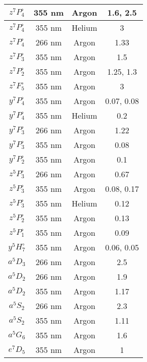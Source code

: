 \documentclass[12pt,twoside]{reedthesis}
\begin{document}
\begin{longtable}{||c|c|c|c||}
	    $z^{7}P^{\circ}_{4}$ & 355 nm & Argon & 1.6, 2.5 \\\hline
	    $z^{7}P^{\circ}_{4}$ & 355 nm & Helium & 3 \\\hline
	    $z^{7}P^{\circ}_{4}$ & 266 nm & Argon & 1.33 \\\hline
	    $z^{7}P^{\circ}_{3}$ & 355 nm & Argon & 1.5 \\\hline
	    $z^{7}P^{\circ}_{2}$ & 355 nm & Argon & 1.25, 1.3 \\\hline
	    $z^{7}F^{\circ}_{5}$ & 355 nm & Argon & 3 \\\hline
	    $y^{7}P^{\circ}_{4}$ & 355 nm & Argon & 0.07, 0.08 \\\hline
	    $y^{7}P^{\circ}_{4}$ & 355 nm & Helium & 0.2 \\\hline
	    $y^{7}P^{\circ}_{3}$ & 266 nm & Argon & 1.22 \\\hline
	    $y^{7}P^{\circ}_{3}$ & 355 nm & Argon & 0.08 \\\hline
	    $y^{7}P^{\circ}_{2}$ & 355 nm & Argon & 0.1 \\\hline
	    $z^{5}P^{\circ}_{3}$ & 266 nm & Argon & 0.67 \\\hline
	    $z^{5}P^{\circ}_{3}$ & 355 nm & Argon & 0.08, 0.17 \\\hline
	    $z^{5}P^{\circ}_{3}$ & 355 nm & Helium & 0.12 \\\hline
	    $z^{5}P^{\circ}_{2}$ & 355 nm & Argon & 0.13 \\\hline
	    $z^{5}P^{\circ}_{1}$ & 355 nm & Argon & 0.09 \\\hline
	    $y^{5}H^{\circ}_{7}$ & 355 nm & Argon & 0.06, 0.05 \\\hline
	    $a^{5}D_{3}$ & 266 nm & Argon & 2.5 \\\hline
	    $a^{5}D_{2}$ & 266 nm & Argon & 1.9 \\\hline
	    $a^{5}D_{2}$ & 355 nm & Argon & 1.17 \\\hline
	    $a^{5}S_{2}$ & 266 nm & Argon & 2.3 \\\hline
	    $a^{5}S_{2}$ & 355 nm & Argon & 1.11 \\\hline
	    $a^{5}G_{6}$ & 355 nm & Argon & 1.6 \\\hline
	    $e^{7}D_{5}$ & 355 nm & Argon & 1 \\\hline

		\end{longtable}
\end{document}
